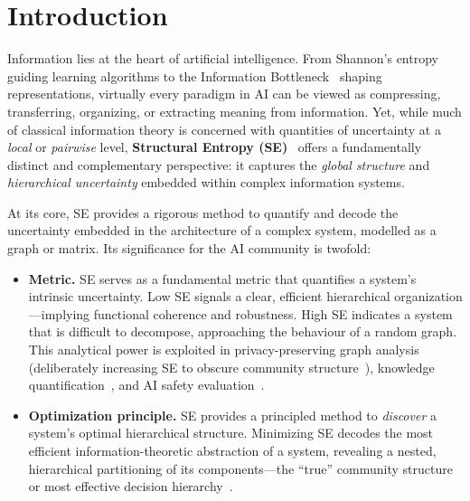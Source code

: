 \section{Introduction}
\label{sec:introduction}

Information lies at the heart of artificial intelligence.
From Shannon's entropy~\cite{shannon1948mathematical} guiding learning
algorithms to the Information Bottleneck~\cite{tishby2000information} shaping
representations, virtually every paradigm in AI can be viewed as
compressing, transferring, organizing, or extracting meaning from information.
Yet, while much of classical information theory is concerned with quantities
of uncertainty at a \emph{local} or \emph{pairwise} level,
\textbf{Structural Entropy (SE)}~\cite{Li2016} offers a fundamentally
distinct and complementary perspective: it captures the \emph{global
structure} and \emph{hierarchical uncertainty} embedded within complex
information systems.

At its core, SE provides a rigorous method to quantify and decode the
uncertainty embedded in the architecture of a complex system, modelled as a
graph or matrix.
Its significance for the AI community is twofold:

\begin{itemize}
  \item \textbf{Metric.}
        SE serves as a fundamental metric that quantifies a system's intrinsic
        uncertainty.
        Low SE signals a clear, efficient hierarchical organization---implying
        functional coherence and robustness.
        High SE indicates a system that is difficult to decompose, approaching
        the behaviour of a random graph.
        This analytical power is exploited in privacy-preserving graph analysis
        (deliberately increasing SE to obscure community
        structure~\cite{liu2019rem}), knowledge
        quantification~\cite{wang2023quantifyingKnowledge}, and AI safety
        evaluation~\cite{zeng2025si2af}.

  \item \textbf{Optimization principle.}
        SE provides a principled method to \emph{discover} a system's optimal
        hierarchical structure.
        Minimizing SE decodes the most efficient information-theoretic
        abstraction of a system, revealing a nested, hierarchical partitioning
        of its components---the ``true'' community
        structure~\cite{Li2016} or most effective decision
        hierarchy~\cite{zeng2025sidmJMLR}.
\end{itemize}

